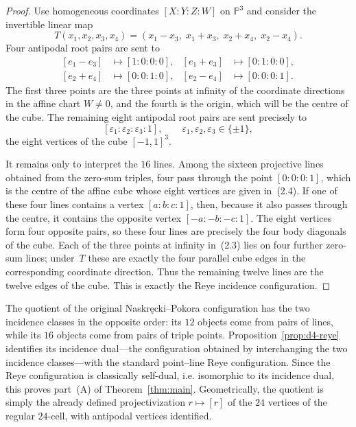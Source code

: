 \documentclass[10pt]{article}
\newcommand{\PP}{\mathbb P}
\begin{document}
\begin{proof}
Use homogeneous coordinates $[X:Y:Z:W]$ on $\PP^3$ and consider the invertible linear map
\[
T(x_1,x_2,x_3,x_4)
=(x_1-x_3,\;x_1+x_3,\;x_2+x_4,\;x_2-x_4).
\tag{2.2}
\]
Four antipodal root pairs are sent to
\[
\begin{aligned}
[e_1-e_3]&\mapsto[1:0:0:0],&
[e_1+e_3]&\mapsto[0:1:0:0],\\
[e_2+e_4]&\mapsto[0:0:1:0],&
[e_2-e_4]&\mapsto[0:0:0:1].
\end{aligned}
\tag{2.3}
\]
The first three points are the three points at infinity of the coordinate directions in the affine chart $W\neq0$, and the fourth is the origin, which will be the centre of the cube.  The remaining eight antipodal root pairs are sent precisely to
\[
[\varepsilon_1:\varepsilon_2:\varepsilon_3:1],
\qquad \varepsilon_1,\varepsilon_2,\varepsilon_3\in\{\pm1\},
\tag{2.4}
\]
the eight vertices of the cube $[-1,1]^3$.

It remains only to interpret the $16$ lines.  Among the sixteen projective lines obtained from the zero-sum triples, four pass through the point $[0:0:0:1]$, which is the centre of the affine cube whose eight vertices are given in~(2.4).  If one of these four lines contains a vertex $[a:b:c:1]$, then, because it also passes through the centre, it contains the opposite vertex $[-a:-b:-c:1]$.  The eight vertices form four opposite pairs, so these four lines are precisely the four body diagonals of the cube.  Each of the three points at infinity in~(2.3) lies on four further zero-sum lines; under~$T$ these are exactly the four parallel cube edges in the corresponding coordinate direction.  Thus the remaining twelve lines are the twelve edges of the cube.  This is exactly the Reye incidence configuration.  \qedhere
\end{proof}

The quotient of the original Naskr\k{e}cki--Pokora configuration has the two incidence classes in the opposite order: its $12$ objects come from pairs of lines, while its $16$ objects come from pairs of triple points.  Proposition~\ref{prop:d4-reye} identifies its incidence dual---the configuration obtained by interchanging the two incidence classes---with the standard point--line Reye configuration.  Since the Reye configuration is classically self-dual, i.e. isomorphic to its incidence dual, this proves part~\textup{(A)} of Theorem~\ref{thm:main}.  Geometrically, the quotient is simply the already defined projectivization $r\mapsto[r]$ of the $24$ vertices of the regular $24$-cell, with antipodal vertices identified.
\end{document}
